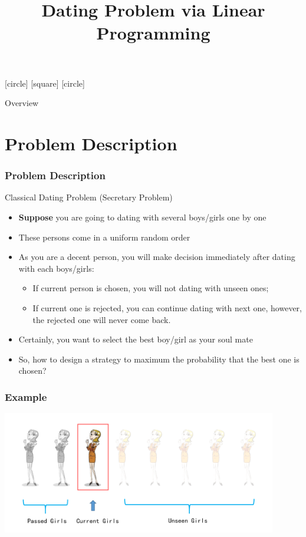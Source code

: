 \documentclass{beamer}
\title{Dating Problem via Linear Programming}
\author{}
\date{}
\begin{document}
\beamerdefaultoverlayspecification{<+->}
\begin{frame}
  \maketitle
\end{frame}
[circle]
[square]
[circle]
\begin{frame}{Overview}\centering
\tableofcontents
\end{frame}
\section{Problem Description}

\begin{frame}
  \frametitle{Problem Description}
  \begin{block}{Classical Dating Problem (Secretary Problem)}
  \begin{itemize}
	\item \textbf{Suppose} you are going to dating with several boys/girls one by one
	\item These persons come in a uniform random order
	\item As you are a decent person, you will make decision immediately after dating with each boys/girls:
  	\begin{itemize}
	  \item If current person is chosen, you will not dating with
			 unseen ones;
	  \item If current one is rejected, you can continue dating with
			 next one, however, the rejected one will never come back.
   \end{itemize}
  \item Certainly, you want to select the best boy/girl as your soul mate
  \item So, how to design a strategy to maximum the probability that the best
		  one is chosen?
  \end{itemize}
  \end{block}
\end{frame}

\begin{frame}
	\frametitle{Example}
	\includegraphics[width=12cm]{Problems/secretary1.png}
\end{frame}
\end{document}

